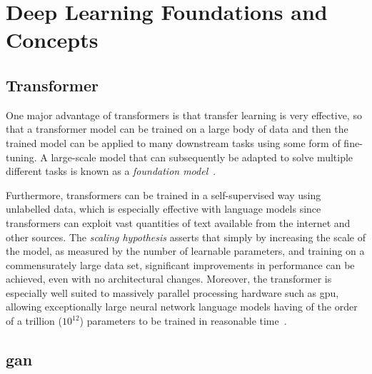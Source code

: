\chapter{Deep Learning Foundations and Concepts}\label{chp:deep_learning_foundations_concepts}
\minitoc

\section{Transformer}

One major advantage of transformers is that transfer learning is very effective, so that a transformer model can be trained on a large body of data and then the trained model can be applied to many downstream tasks using some form of fine-tuning.
A large-scale model that can subsequently be adapted to solve multiple different tasks is known as a \emph{foundation model}~\cite{Bishop2023Nov}.

Furthermore, transformers can be trained in a self-supervised way using unlabelled data, which is especially effective with language models since transformers can exploit vast quantities of text available from the internet and other sources.
The \emph{scaling hypothesis} asserts that simply by increasing the scale of the model, as measured by the number of learnable parameters, and training on a commensurately large data set, significant improvements in performance can be achieved, even with no architectural changes.
Moreover, the transformer is especially well suited to massively parallel processing hardware such as \gls{gpu}, allowing exceptionally large neural network language models having of the order of a trillion (\( 10^{12} \)) parameters to be trained in reasonable time~\cite{Bishop2023Nov}.




\section{\gls{gan}}

